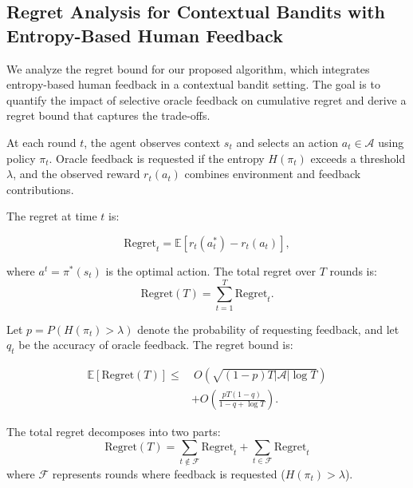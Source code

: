 \subsection{Regret Analysis for Contextual Bandits with Entropy-Based Human Feedback}

We analyze the regret bound for our proposed algorithm, which integrates entropy-based human feedback in a contextual bandit setting. The goal is to quantify the impact of selective oracle feedback on cumulative regret and derive a regret bound that captures the trade-offs.

At each round $t$, the agent observes context $s_t$ and selects an action $a_t \in \mathcal{A}$ using policy $\pi_t$. Oracle feedback is requested if the entropy $H(\pi_t)$ exceeds a threshold $\lambda$, and the observed reward $r_t(a_t)$ combines environment and feedback contributions.

The regret at time $t$ is:

\begin{equation}
\text{Regret}_t = \mathbb{E}[r_t(a_t^{*}) - r_t(a_t)],
\end{equation}

where $a^t = \pi^*(s_t)$ is the optimal action. The total regret over $T$ rounds is:
\begin{equation}
\text{Regret}(T) = \sum_{t=1}^T \text{Regret}_t.
\end{equation}



Let $p = P(H(\pi_t) > \lambda)$ denote the probability of requesting feedback, and let $q_t$ be the accuracy of oracle feedback. The regret bound is:

\begin{equation}
\begin{aligned}
\mathbb{E}[\text{Regret}(T)] \leq  
&\ O\left(\sqrt{(1 - p)T |\mathcal{A}| \log T} \right) \\
&+ O\left( \frac{p T (1 - q)}{1 - q + \log T} \right).
\end{aligned}
\end{equation}



The total regret decomposes into two parts:
\begin{equation}
\text{Regret}(T) =  \sum_{t \notin \mathcal{F}} \text{Regret}_t + \sum_{t \in \mathcal{F}} \text{Regret}_t 
\end{equation}
where $\mathcal{F}$ represents rounds where feedback is requested ($H(\pi_t) > \lambda$).

